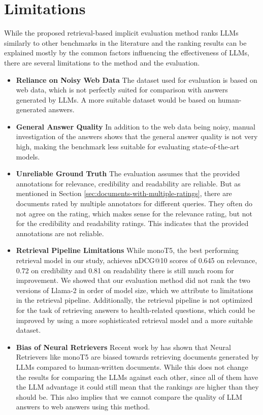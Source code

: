\section{Limitations}
While the proposed retrieval-based implicit evaluation method ranks LLMs similarly to other benchmarks in the literature and the ranking results can be explained mostly by the common factors influencing the effectiveness of LLMs, there are several limitations to the method and the evaluation.


\begin{itemize}
    \item 	\textbf{Reliance on Noisy Web Data} The dataset used for evaluation is based on web data, which is not perfectly suited for comparison with answers generated by LLMs. A more suitable dataset would be based on human-generated answers.

    \item 	\textbf{General Answer Quality} In addition to the web data being noisy, manual investigation of the answers shows that the general answer quality is not very high, making the benchmark less suitable for evaluating state-of-the-art models.

    \item 	\textbf{Unreliable Ground Truth} The evaluation assumes that the provided annotations for relevance, credibility and readability are reliable. But as mentioned in Section \ref{sec:documents-with-multiple-ratings}, there are documents rated by multiple annotators for different queries. They often do not agree on the rating, which makes sense for the relevance rating, but not for the credibility and readability ratings. This indicates that the provided annotations are not reliable.

    \item 	\textbf{Retrieval Pipeline Limitations} While monoT5, the best performing retrieval model in our study, achieves nDCG@10 scores of 0.645 on relevance, 0.72 on credibility and 0.81 on readability there is still much room for improvement. We showed that our evaluation method did not rank the two versions of Llama-2 in order of model size, which we attribute to limitations in the retrieval pipeline. Additionally, the retrieval pipeline is not optimized for the task of retrieving answers to health-related questions, which could be improved by using a more sophisticated retrieval model and a more suitable dataset.

    \item   \textbf{Bias of Neural Retrievers} Recent work by \cite{dai:2023:llms} has shown that Neural Retrievers like monoT5 are biased towards retrieving documents generated by LLMs compared to human-written documents. While this does not change the results for comparing the LLMs against each other, since all of them have the LLM advantage it could still mean that the rankings are higher than they should be. This also implies that we cannot compare the quality of LLM answers to web answers using this method.
\end{itemize}